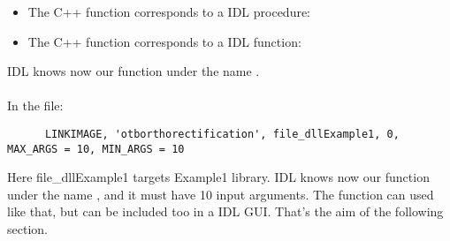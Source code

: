 \begin{itemize}
\item The C++ function corresponds to a IDL procedure:\\
\item The C++ function corresponds to a IDL function:\\
\end{itemize}
IDL knows now our function under the name .\\

\\
      In the  file:\\
\begin{verbatim}
      LINKIMAGE, 'otborthorectification', file_dllExample1, 0, MAX_ARGS = 10, MIN_ARGS = 10
\end{verbatim}

Here file\_dllExample1 targets Example1 library.
IDL knows now our function under the name , and it must have 10 input arguments. The function can used like that, but can be included too in a IDL GUI.
That's the aim of the following section.\\



